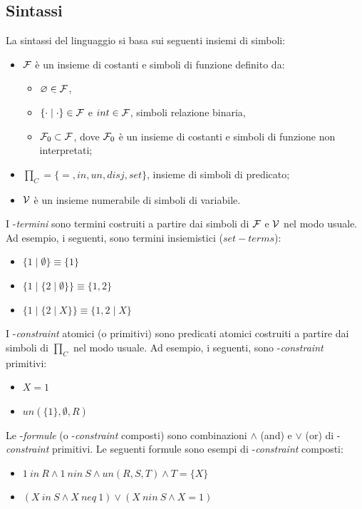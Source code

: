 \documentclass[12pt,a4paper,openright]{book} %
\begin{document}
\subsection{Sintassi}
\label{subsec:clpbasedlang_lset_sintax}

La sintassi del linguaggio \lset{} si basa sui seguenti insiemi di
simboli:

\begin{itemize}
	\item $\mathcal{F}$ è un insieme di costanti e simboli di funzione
          definito da:
	\begin{itemize}
		\item $\varnothing \in \mathcal{F}$,
		\item $\{ \cdot \mid \cdot \} \in \mathcal{F}$ e $int \in
                  \mathcal{F}$, simboli relazione binaria,
		\item $\mathcal{F}_0 \subset \mathcal{F}$, dove $\mathcal{F}_0$ è un
                  insieme di costanti e simboli di funzione non
                  interpretati;
	\end{itemize}
	\item $\prod_C = \{ =, in, un, disj, set \}$, insieme di
          simboli di predicato;
	\item $\mathcal{V}$ è un insieme numerabile di simboli di variabile.
\end{itemize}

I \calset{}-\textit{termini} sono termini costruiti a partire dai
simboli di $\mathcal{F}$ e $\mathcal{V}$ nel modo usuale. Ad esempio, i seguenti,
sono termini insiemistici ($set-terms$):
\begin{itemize}
	\item $\{1 \mid \emptyset \} \equiv \{1\}$
	\item $\{1 \mid \{2 \mid \emptyset \} \} \equiv \{1,2\}$
	\item $\{1 \mid \{2 \mid X \} \} \equiv \{1,2 \mid X \}$
\end{itemize}

I \calset{}-\textit{constraint} atomici (o primitivi) sono predicati
atomici costruiti a partire dai simboli di $\prod_C$ nel modo
usuale. Ad esempio, i seguenti, sono \calset{}-\textit{constraint}
primitivi:
\begin{itemize}
	\item $X = 1$
	\item $un(\{1\}, \emptyset, R)$
\end{itemize}

Le \calset{}-\textit{formule} (o \calset{}-\textit{constraint}
composti) sono combinazioni $\wedge$ (and) e $\vee$ (or) di
\calset{}-\textit{constraint} primitivi. Le seguenti formule sono
esempi di \calset{}-\textit{constraint} composti:
\begin{itemize}
	\item $1\ in\ R \land 1\ nin\ S \land un(R,S,T) \land T = \{X\}$
	\item $(X\ in\ S \land X\ neq\ 1) \lor (X\ nin\ S \land X = 1)$
\end{itemize}
\end{document}
